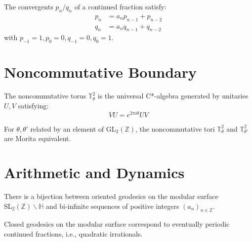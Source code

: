 \documentclass{article}
\begin{document}
\begin{proposition}[Convergents]
\label{prop:convergents}
The convergents $p_n/q_n$ of a continued fraction satisfy:
\begin{align}
p_n &= a_n p_{n-1} + p_{n-2} \\
q_n &= a_n q_{n-1} + q_{n-2}
\end{align}
with $p_{-1} = 1, p_0 = 0, q_{-1} = 0, q_0 = 1$.
\end{proposition}

\section{Noncommutative Boundary}
\label{sec:nc-boundary}

\begin{definition}
\label{def:nc-torus}
The noncommutative torus $\mathbb{T}^2_\theta$ is the universal C*-algebra
generated by unitaries $U, V$ satisfying:
$$VU = e^{2\pi i \theta} UV$$
\end{definition}

\begin{theorem}
\label{thm:morita}
For $\theta, \theta'$ related by an element of $\text{GL}_2(\mathbb{Z})$,
the noncommutative tori $\mathbb{T}^2_\theta$ and $\mathbb{T}^2_{\theta'}$
are Morita equivalent.
\end{theorem}

\section{Arithmetic and Dynamics}
\label{sec:arithmetic}

\begin{theorem}
\label{thm:geodesic-coding}
There is a bijection between oriented geodesics on the modular surface
$\text{SL}_2(\mathbb{Z}) \backslash \mathbb{H}$ and bi-infinite sequences
of positive integers $(a_n)_{n \in \mathbb{Z}}$.
\end{theorem}

\begin{corollary}
\label{cor:periodic-geodesics}
Closed geodesics on the modular surface correspond to eventually periodic
continued fractions, i.e., quadratic irrationals.
\end{corollary}
\end{document}
